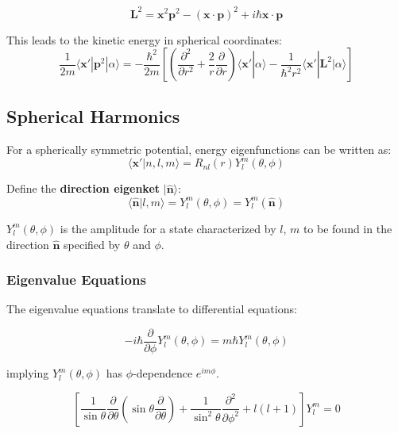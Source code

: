 \documentclass[11pt,a4paper]{article}
\begin{document}
\begin{equation}
\boxed{\mathbf{L}^2 = \mathbf{x}^2\mathbf{p}^2 - (\mathbf{x}\cdot\mathbf{p})^2 + i\hbar\mathbf{x}\cdot\mathbf{p}}
\tag{3.225}
\end{equation}

This leads to the kinetic energy in spherical coordinates:
\begin{equation}
\frac{1}{2m}\langle\mathbf{x}'|\mathbf{p}^2|\alpha\rangle = -\frac{\hbar^2}{2m}\left[\left(\frac{\partial^2}{\partial r^2} + \frac{2}{r}\frac{\partial}{\partial r}\right)\langle\mathbf{x}'|\alpha\rangle - \frac{1}{\hbar^2 r^2}\langle\mathbf{x}'|\mathbf{L}^2|\alpha\rangle\right]
\tag{3.230}
\end{equation}

\subsection{Spherical Harmonics}

For a spherically symmetric potential, energy eigenfunctions can be written as:
\begin{equation}
\langle\mathbf{x}'|n, l, m\rangle = R_{nl}(r)Y_l^m(\theta, \phi)
\tag{3.231}
\end{equation}

Define the \textbf{direction eigenket} $|\hat{\mathbf{n}}\rangle$:
\begin{equation}
\langle\hat{\mathbf{n}}|l, m\rangle = Y_l^m(\theta, \phi) = Y_l^m(\hat{\mathbf{n}})
\tag{3.232}
\end{equation}

$Y_l^m(\theta, \phi)$ is the amplitude for a state characterized by $l$, $m$ to be found in the direction $\hat{\mathbf{n}}$ specified by $\theta$ and $\phi$.

\subsubsection{Eigenvalue Equations}

The eigenvalue equations translate to differential equations:

\begin{equation}
-i\hbar\frac{\partial}{\partial\phi}Y_l^m(\theta, \phi) = m\hbar Y_l^m(\theta, \phi)
\tag{3.235}
\end{equation}

implying $Y_l^m(\theta, \phi)$ has $\phi$-dependence $e^{im\phi}$.

\begin{equation}
\left[\frac{1}{\sin\theta}\frac{\partial}{\partial\theta}\left(\sin\theta\frac{\partial}{\partial\theta}\right) + \frac{1}{\sin^2\theta}\frac{\partial^2}{\partial\phi^2} + l(l+1)\right]Y_l^m = 0
\tag{3.237}
\end{equation}
\end{document}
